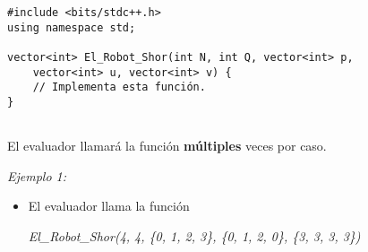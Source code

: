 \documentclass[12pt]{scrartcl}
\begin{document}
\begin{verbatim}
#include <bits/stdc++.h>
using namespace std;

vector<int> El_Robot_Shor(int N, int Q, vector<int> p,
    vector<int> u, vector<int> v) {
    // Implementa esta función.
}
    
\end{verbatim}

    El evaluador llamará la función \textbf{múltiples} veces por caso.
    

               
        {\itshape Ejemplo 1:}
        \begin{itemize}
            \item El evaluador llama la función 
            \begin{center}
                \textit{El\_Robot\_Shor(4, 4, \{0, 1, 2, 3\}, \{0, 1, 2, 0\}, \{3, 3, 3, 3\})}
            \end{center}
            

\end{itemize}
\end{document}
